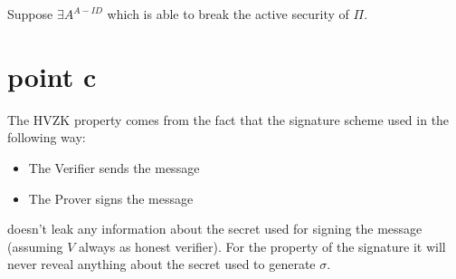 Suppose $\exists A^{A-ID}$ which is able to break the active security of $\Pi$.
\begin{figure}[h!]
    \centering
    \sdinit{}
\end{figure}

\section{point c}

The HVZK property comes from the fact that the signature scheme used in the following way:

\begin{itemize}
    \item The Verifier sends the message
    \item The Prover signs the message
\end{itemize} 

doesn't leak any information about the secret used for signing the message (assuming $V$ always as honest verifier). For the property of the signature it will never reveal anything about the secret used to generate $\sigma$.